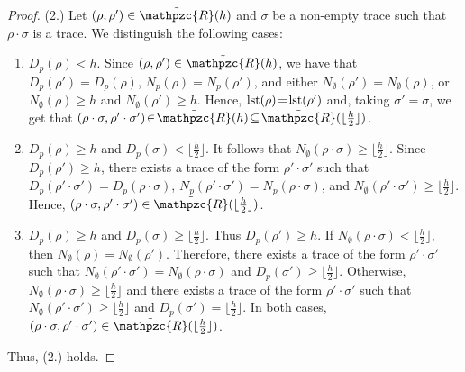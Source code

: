 \begin{proof}
(2.) Let $(\rho,\rho')\in \tilde{\mathpzc{R}}(h)$ and $\sigma$ be a non-empty trace such that $\rho\cdot \sigma$ is a trace. We distinguish the following cases:
 \begin{enumerate}
  \item $D_p(\rho)<h$. Since $(\rho,\rho')\in \tilde{\mathpzc{R}}(h)$, we have that $D_p(\rho')= D_p(\rho)$, $N_p(\rho)=N_p(\rho')$, and either $N_\emptyset(\rho')=N_\emptyset(\rho)$, or $N_\emptyset(\rho)\geq h$ and $N_\emptyset(\rho')\geq h$. Hence, $\operatorname{lst}(\rho)\!=\!\operatorname{lst}(\rho')$ and, taking $\sigma'\!=\!\sigma$, we get that
        $(\rho\cdot\sigma,\rho'\cdot\sigma')\!\in\! \tilde{\mathpzc{R}}(h)\!\subseteq\! \tilde{\mathpzc{R}}(\lfloor \frac{h}{2}\rfloor)$.
  \item $D_p(\rho)\geq h$ and $D_p(\sigma)<\lfloor \frac{h}{2}\rfloor$. It follows that $N_\emptyset(\rho\cdot\sigma)\geq \lfloor \frac{h}{2}\rfloor$. Since
$D_p(\rho')\geq h$, there exists a trace of the form $\rho'\cdot \sigma'$ such that $D_p(\rho'\cdot\sigma')=D_p(\rho\cdot\sigma)$, $N_p(\rho'\cdot\sigma')=N_p(\rho\cdot\sigma)$,
and $N_\emptyset(\rho'\cdot\sigma')\geq \lfloor \frac{h}{2}\rfloor$. Hence,
$(\rho\cdot\sigma,\rho'\cdot\sigma')\in \tilde{\mathpzc{R}}(\lfloor \frac{h}{2}\rfloor)$.
\item $D_p(\rho)\geq h$ and $D_p(\sigma)\geq \lfloor \frac{h}{2}\rfloor$. Thus $D_p(\rho')\geq h$. If $N_\emptyset(\rho\cdot\sigma)<\lfloor \frac{h}{2}\rfloor$, then 
$N_\emptyset(\rho)=N_\emptyset(\rho')$. Therefore, there exists a trace of the form $\rho'\cdot\sigma'$ such that  $N_\emptyset(\rho'\cdot\sigma')=N_\emptyset(\rho\cdot\sigma)$
and $D_p(\sigma')\geq \lfloor \frac{h}{2}\rfloor$. Otherwise, $N_\emptyset(\rho\cdot\sigma)\geq \lfloor \frac{h}{2}\rfloor$ and
   there exists a trace of the form $\rho'\cdot\sigma'$ such that  $N_\emptyset(\rho'\cdot\sigma')\geq \lfloor \frac{h}{2}\rfloor$
and $D_p(\sigma')= \lfloor \frac{h}{2}\rfloor$. In both cases, $(\rho\cdot\sigma,\rho'\cdot\sigma')\in \tilde{\mathpzc{R}}(\lfloor \frac{h}{2}\rfloor)$.
\end{enumerate}
Thus, (2.) holds.
\end{proof}

